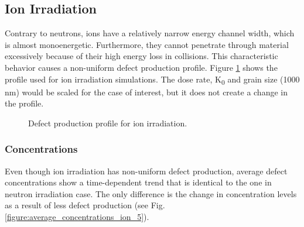 \documentclass[a4paper]{article}
\begin{document}
  \subsection{Ion Irradiation} \hspace{10pt}
  Contrary to neutrons, ions have a relatively narrow energy channel width, which is almost monoenergetic. Furthermore, they cannot penetrate through material excessively because of their high energy loss in collisions. This characteristic behavior causes a non-uniform defect production profile. Figure \ref{figure:defect_production} shows the profile used for ion irradiation simulations. The dose rate, K\textsubscript{0} and grain size (1000 nm) would be scaled for the case of interest, but it does not create a change in the profile.
    \begin{figure}[h!]  %
      \centering
      \qquad
      \caption{Defect production profile for ion irradiation.}
      \label{figure:defect_production}
    \end{figure}
    \newpage
    \subsubsection{Concentrations} \hspace{10pt}
    Even though ion irradiation has non-uniform defect production, average defect concentrations show a time-dependent trend that is identical to the one in neutron irradiation case. The only difference is the change in concentration levels as a result of less defect production (see Fig. \ref{figure:average_concentrations_ion_5}).
\end{document}

